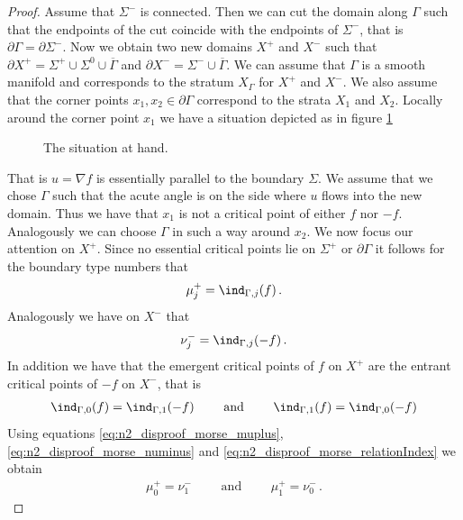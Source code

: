 \begin{proof}
  Assume that $\Sigma^-$ is connected. Then we can cut the domain along $\Gamma$ such that the endpoints
  of the cut coincide with the endpoints of $\Sigma^-$, that is $\partial\Gamma=\partial\Sigma^-$.
  Now we obtain two new domains $X^+$ and $X^-$ such that $\partial X^+ =\Sigma^+\cup\Sigma^0\cup\overline{\Gamma}$ and
  $\partial X^-=\Sigma^-\cup\overline{\Gamma}$. We can assume that $\Gamma$ is a smooth manifold and corresponds to the stratum 
  $X_\Gamma$ for $X^+$ and $X^-$. We also assume that the corner points $x_1,x_2\in\partial\Gamma$ correspond to the strata $X_{1}$ and $X_{2}$.
  Locally around the corner point $x_1$ we have a situation depicted as in figure \ref{}
  \begin{figure}
    \centering
    
    \caption{The situation at hand.}
    \label{}
  \end{figure}
  That is $u=\nabla f$ is essentially parallel to the boundary $\Sigma$.
  We assume that we chose $\Gamma$ such that the acute angle is on the side where $u$ flows into the new domain.
  Thus we have that $x_1$ is not a critical point of either $f$ nor $-f$.
  Analogously we can choose $\Gamma$ in such a way around $x_2$.
  We now focus our attention on $X^+$. Since no essential critical points lie on $\Sigma^+$ or
  $\partial\Gamma$ it follows for the boundary type numbers that
  \begin{align}
    \mu^+_j=\ind_{\Gamma,j}(f)\,.\label{eq:n2_disproof_morse_muplus}
  \end{align}
  Analogously we have on $X^-$ that
  \begin{align}
    \nu^-_j=\ind_{\Gamma,j}(-f)\,.\label{eq:n2_disproof_morse_numinus}
  \end{align}
  In addition we have that the emergent critical points of $f$ on $X^+$ are the
  entrant critical points of $-f$ on $X^-$, that is
  \begin{align}
    \ind_{\Gamma,0}(f)=\ind_{\Gamma,1}(-f)\qquad\text{ and }\qquad 
    \ind_{\Gamma,1}(f)=\ind_{\Gamma,0}(-f)\label{eq:n2_disproof_morse_relationIndex} 
  \end{align}
  Using equations \eqref{eq:n2_disproof_morse_muplus}, \eqref{eq:n2_disproof_morse_numinus} and \eqref{eq:n2_disproof_morse_relationIndex}
  we obtain
  \begin{align}
    \mu^+_0=\nu^-_1 \qquad\text{ and }\qquad \mu^+_1=\nu^-_0\,.\label{eq:n2_disproof_morse_relationMuNu}
  \end{align}

\end{proof}
